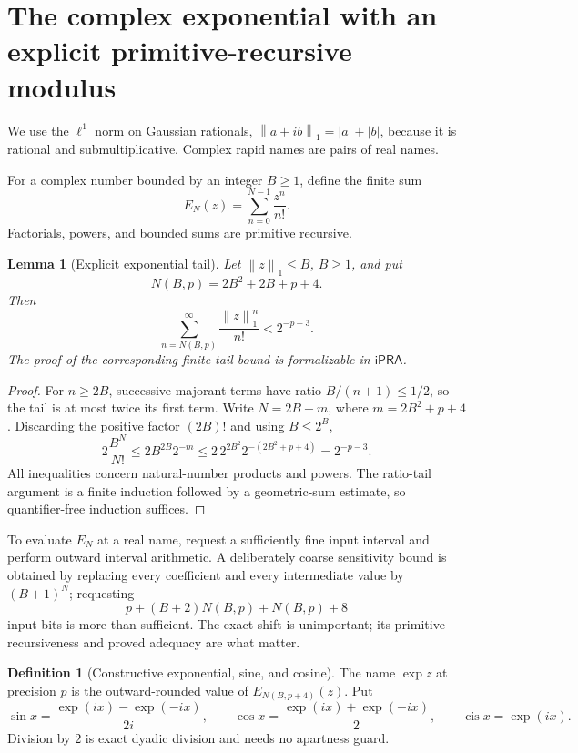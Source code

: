 \documentclass[11pt]{article}
\newtheorem{lemma}[theorem]{Lemma}
\theoremstyle{definition}
\newtheorem{definition}[theorem]{Definition}
\newcommand{\iPRA}{\mathsf{iPRA}}
\newcommand{\cis}{\operatorname{cis}}
\newcommand{\abs}[1]{\left|#1\right|}
\newcommand{\norm}[1]{\left\lVert#1\right\rVert}
\begin{document}
\section{The complex exponential with an explicit primitive-recursive modulus}
\label{sec:exp}

We use the \(\ell^1\) norm on Gaussian rationals,
\(\norm{a+ib}_1=\abs a+\abs b\), because it is rational and submultiplicative.
Complex rapid names are pairs of real names.

For a complex number bounded by an integer \(B\ge1\), define the finite sum
\[
 E_N(z)=\sum_{n=0}^{N-1}\frac{z^n}{n!}.
 \tag{3.1}
\]
Factorials, powers, and bounded sums are primitive recursive.

\begin{lemma}[Explicit exponential tail]
\label{lem:exp-tail}
Let \(\norm z_1\le B\), \(B\ge1\), and put
\[
 N(B,p)=2B^2+2B+p+4.
 \tag{3.2}
\]
Then
\[
 \sum_{n=N(B,p)}^\infty\frac{\norm z_1^n}{n!}<2^{-p-3}.
 \tag{3.3}
\]
The proof of the corresponding finite-tail bound is formalizable in \(\iPRA\).
\end{lemma}

\begin{proof}
For \(n\ge2B\), successive majorant terms have ratio
\(B/(n+1)\le1/2\), so the tail is at most twice its first term.  Write
\(N=2B+m\), where \(m=2B^2+p+4\).  Discarding the positive factor
\((2B)!\) and using \(B\le2^B\),
\[
 2\frac{B^N}{N!}
 \le 2B^{2B}2^{-m}
 \le 2\,2^{2B^2}2^{-(2B^2+p+4)}=2^{-p-3}.
\]
All inequalities concern natural-number products and powers.  The ratio-tail
argument is a finite induction followed by a geometric-sum estimate, so
quantifier-free induction suffices.
\end{proof}

To evaluate \(E_N\) at a real name, request a sufficiently fine input interval
and perform outward interval arithmetic.  A deliberately coarse sensitivity
bound is obtained by replacing every coefficient and every intermediate value
by \((B+1)^N\); requesting
\[
 p+(B+2)N(B,p)+N(B,p)+8
 \tag{3.4}
\]
input bits is more than sufficient.  The exact shift is unimportant; its
primitive recursiveness and proved adequacy are what matter.

\begin{definition}[Constructive exponential, sine, and cosine]
The name \(\exp z\) at precision \(p\) is the outward-rounded value of
\(E_{N(B,p+4)}(z)\).  Put
\[
 \sin x=\frac{\exp(ix)-\exp(-ix)}{2i},\qquad
 \cos x=\frac{\exp(ix)+\exp(-ix)}2,
 \qquad \cis x=\exp(ix).
 \tag{3.5}
\]
Division by \(2\) is exact dyadic division and needs no apartness guard.
\end{definition}
\end{document}
